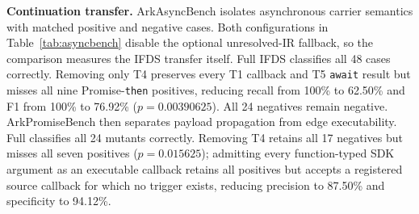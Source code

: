 \textbf{Continuation transfer.}
ArkAsyncBench isolates asynchronous carrier semantics with matched positive and negative cases. Both configurations in Table~\ref{tab:asyncbench} disable the optional unresolved-IR fallback, so the comparison measures the IFDS transfer itself. Full IFDS classifies all 48 cases correctly. Removing only T4 preserves every T1 callback and T5 \texttt{await} result but misses all nine Promise-\texttt{then} positives, reducing recall from 100\% to 62.50\% and F1 from 100\% to 76.92\% ($p=0.00390625$). All 24 negatives remain negative. ArkPromiseBench then separates payload propagation from edge executability. Full \mytool classifies all 24 mutants correctly. Removing T4 retains all 17 negatives but misses all seven positives ($p=0.015625$); admitting every function-typed SDK argument as an executable callback retains all positives but accepts a registered source callback for which no trigger exists, reducing precision to 87.50\% and specificity to 94.12\%.

